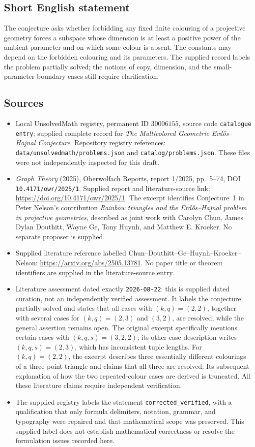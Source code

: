 \documentclass[11pt]{article}
\begin{document}
\subsection{Short English statement}
The conjecture asks whether forbidding any fixed finite colouring of a projective geometry forces a subspace whose dimension is at least a positive power of the ambient parameter and on which some colour is absent. The constants may depend on the forbidden colouring and its parameters. The supplied record labels the problem partially solved; the notions of copy, dimension, and the small-parameter boundary cases still require clarification.
\subsection{Sources}
\begin{itemize}
\item Local UnsolvedMath registry, permanent ID \(30006155\), source code \texttt{catalogue entry}; supplied complete record for \emph{The Multicolored Geometric Erd\H{o}s--Hajnal Conjecture}. Repository registry references: \texttt{data/unsolvedmath/problems.json} and \texttt{catalog/problems.json}. These files were not independently inspected for this draft.
\item \emph{Graph Theory} (2025), Oberwolfach Reports, report 1/2025, pp.~5--74, DOI \texttt{10.4171/owr/2025/1}. Supplied report and literature-source link: \url{https://doi.org/10.4171/owr/2025/1}. The excerpt identifies Conjecture~1 in Peter Nelson's contribution \emph{Rainbow triangles and the Erd\H{o}s--Hajnal problem in projective geometries}, described as joint work with Carolyn Chun, James Dylan Douthitt, Wayne Ge, Tony Huynh, and Matthew E. Kroeker. No separate proposer is supplied.
\item Supplied literature reference labelled Chun--Douthitt--Ge--Huynh--Kroeker--Nelson: \url{https://arxiv.org/abs/2505.13781}. No paper title or theorem identifiers are supplied in the literature-source entry.
\item Literature assessment dated exactly \texttt{2026-08-22}: this is supplied dated curation, not an independently verified assessment. It labels the conjecture partially solved and states that all cases with \((k,q)=(2,2)\), together with several cases for \((k,q)=(2,3)\) and \((3,2)\), are resolved, while the general assertion remains open. The original excerpt specifically mentions certain cases with \((k,q,s)=(3,2,2)\); its other case description writes \((k,q,s)=(2,3)\), which has inconsistent tuple lengths. For \((k,q)=(2,2)\), the excerpt describes three essentially different colourings of a three-point triangle and claims that all three are resolved. Its subsequent explanation of how the two repeated-colour cases are derived is truncated. All these literature claims require independent verification.
\item The supplied registry labels the statement \texttt{corrected\_verified}, with a qualification that only formula delimiters, notation, grammar, and typography were repaired and that mathematical scope was preserved. This supplied label does not establish mathematical correctness or resolve the formulation issues recorded here.
\end{itemize}
\end{document}
